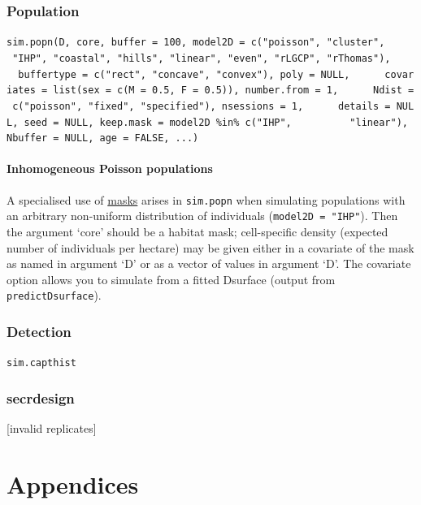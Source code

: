 \documentclass[
]{book}
\begin{document}
\section{Population}\label{population}


\texttt{sim.popn(D,\ core,\ buffer\ =\ 100,\ model2D\ =\ c("poisson",\ "cluster",\ \ \ \ \ \ "IHP",\ "coastal",\ "hills",\ "linear",\ "even",\ "rLGCP",\ "rThomas"),\ \ \ \ \ \ buffertype\ =\ c("rect",\ "concave",\ "convex"),\ poly\ =\ NULL,\ \ \ \ \ \ covariates\ =\ list(sex\ =\ c(M\ =\ 0.5,\ F\ =\ 0.5)),\ number.from\ =\ 1,\ \ \ \ \ \ Ndist\ =\ c("poisson",\ "fixed",\ "specified"),\ nsessions\ =\ 1,\ \ \ \ \ \ details\ =\ NULL,\ seed\ =\ NULL,\ keep.mask\ =\ model2D\ \%in\%\ c("IHP",\ \ \ \ \ \ \ \ \ \ "linear"),\ Nbuffer\ =\ NULL,\ age\ =\ FALSE,\ ...)}

\subsection{Inhomogeneous Poisson populations}\label{inhomogeneous-poisson-populations}

A specialised use of \hyperref[Habitat]{masks} arises in \texttt{sim.popn} when simulating populations with an arbitrary non-uniform distribution of individuals (\texttt{model2D\ =\ "IHP"}). Then the argument `core' should be a habitat mask; cell-specific density (expected number of individuals per hectare) may be given either in a covariate of the mask as named in argument `D' or as a vector of values in argument `D'. The covariate option allows you to simulate from a fitted Dsurface (output from \texttt{predictDsurface}).

\section{Detection}\label{detection}


\texttt{sim.capthist}

\section{\texorpdfstring{\textbf{secrdesign}}{secrdesign}}\label{secrdesign}


{[}invalid replicates{]}

\part*{Appendices}\label{part-appendices}
\end{document}

